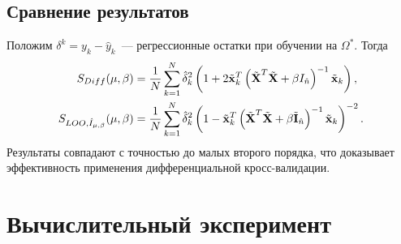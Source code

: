 \documentclass[unicode,lefteqn,c,hyperref={pdfpagelabels=false}]{beamer}
\begin{document}
\subsection{Сравнение результатов}
\begin{frame}{}
	Положим $\delta^k = y_k - \hat y_k$~--- регрессионные остатки при обучении на $\Omega^*$.
	Тогда
	\begin{align*}
		S_{Diff}({\mu,\beta})
			&= \frac1N\sum\limits_{k=1}^N
			\hat{\delta}_k^2
			\left(1 + 2\tilde {\boldsymbol{\mathbf{x}}}_k^T \left(\tilde{\boldsymbol{\mathbf{X}}}^T \tilde{\boldsymbol{\mathbf{X}}} + \beta I_{\hat n}\right)^{-1}\tilde{\boldsymbol{\mathbf{x}}}_k\right), \\
		S_{LOO, \hat I_{\mu,\beta}}({\mu,\beta})
			&= \frac1N\sum\limits_{k=1}^N
				\hat{\delta}_k^2
				\left(
				1 -
				\tilde{\boldsymbol{\mathbf{x}}}_k^T
				\left(\tilde{\boldsymbol{\mathbf{X}}}^T\tilde{\boldsymbol{\mathbf{X}}} + \beta \tilde{\boldsymbol{\mathbf{I}}}_{\hat n}\right)^{-1}
				\tilde{\boldsymbol{\mathbf{x}}}_k
				\right)^{-2}.
	\end{align*}
	Результаты совпадают с точностью до малых второго порядка, что доказывает эффективность применения дифференциальной кросс-валидации.
\end{frame}

\newcommand\addcolumn[3]{
	\column{0.33\textwidth}
		\texttt{[image: ../graph/\#1.png]}
		\vspace{10pt}
		\begin{center}
			\vspace{-25pt}
			$#2$
			\vspace{-5pt}
			\begin{align*}
			#3.
			\end{align*}
		\end{center}
}

\section{Вычислительный эксперимент}
\end{document}
